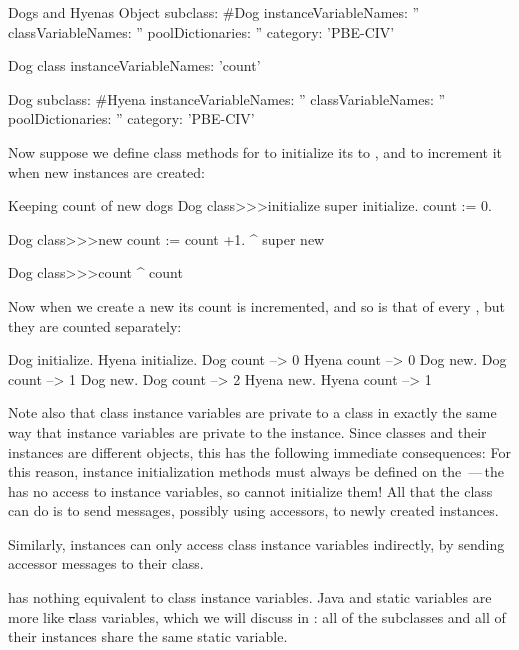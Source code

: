 \documentclass[a4paper,10pt,twoside]{book}
\begin{document}
\begin{classdef}[dog]{Dogs and Hyenas}
Object subclass: #Dog
	instanceVariableNames: ''
	classVariableNames: ''
	poolDictionaries: ''
	category: 'PBE-CIV'

Dog class
	instanceVariableNames: 'count'

Dog subclass: #Hyena
	instanceVariableNames: ''
	classVariableNames: ''
	poolDictionaries: ''
	category: 'PBE-CIV'
\end{classdef}

Now suppose we define class methods for  to initialize its  to , and to increment it when new instances are created:
\begin{method}[dogcount]{Keeping count of new dogs}
Dog class>>>initialize
	super initialize.
	count := 0.

Dog class>>>new
	count := count +1.
	^ super new

Dog class>>>count
	^ count
\end{method}

Now when we create a new  its count is incremented, and so is that of every , but they are counted separately:
\begin{code}{}
Dog initialize.
Hyena initialize.
Dog count     --> 0
Hyena count --> 0
Dog new.
Dog count     --> 1
Dog new.
Dog count     --> 2
Hyena new.
Hyena count --> 1
\end{code}

Note also that class instance variables are private to a class in exactly the same way that instance variables are private to the instance.
Since classes and their instances are different objects,
this has the following immediate consequences:
For this reason, instance initialization methods must always be defined on the \,---\,the  has no access to instance variables, so cannot initialize them!  
All that the class can do is to send  messages, possibly using accessors, to newly created instances.

Similarly, instances can only access class instance variables indirectly, by sending accessor messages to their class.

 has nothing equivalent to class instance variables.  
Java and  static variables are more like \st class variables, which we will discuss in : all of the subclasses and all of their instances share the same static variable.
\end{document}
